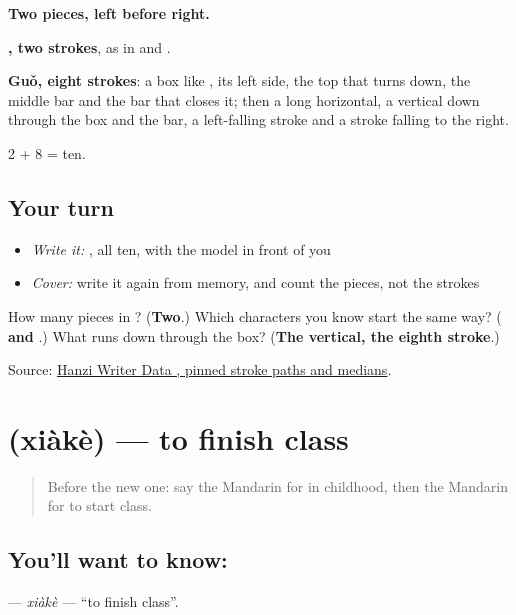 \begin{quote}
\end{quote}

\textbf{Two pieces, left before right.}

\textbf{, two strokes}, as in  and .

\textbf{Guǒ, eight strokes}: a box like , its left side, the top that turns down, the middle bar and the bar that closes it; then a long horizontal, a vertical down through the box and the bar, a left-falling stroke and a stroke falling to the right.

2 + 8 = ten.

\subsection*{Your turn}
\begin{itemize}
\raggedright
  \item \emph{Write it:} , all ten, with the model in front of you
  \item \emph{Cover:} write it again from memory, and count the pieces, not the strokes
\end{itemize}

\begin{tcolorbox}[breakable,colback=teal!4,colframe=teal!35!black,title={Before you move on}]
How many pieces in ? (\textbf{Two}.) Which characters you know start the same way? (\textbf{ and }.) What runs down through the box? (\textbf{The vertical, the eighth stroke}.)

Source: \href{https://raw.githubusercontent.com/chanind/hanzi-writer-data/68d10a4b21150cae5e1ebbd223eed289cf32d90c/data/\%E8\%AF\%BE.json}{Hanzi Writer Data , pinned stroke paths and medians}.
\end{tcolorbox}
\section[\texorpdfstring{\zh{下课} (xiàkè)}{下课 (xiàkè)}]{ (xiàkè) — to finish class}

\label{lesson:ZH-C79-xiake}



\begin{quote}
Before the new one: say the Mandarin for in childhood, then the Mandarin for to start class.
\end{quote}

\subsection*{You'll want to know: }
\textbf{} — \emph{xiàkè} — \textquotedblleft{}to finish class\textquotedblright{}.

